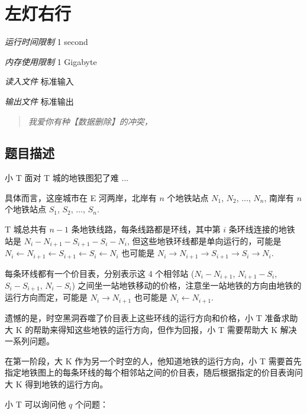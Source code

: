 \section[D. 左灯右行]{ 左灯右行}

\textit{运行时间限制}   1 second

\textit{内存使用限制} 1 Gigabyte

\textit{读入文件} \qquad 标准输入

\textit{输出文件} \qquad 标准输出


\begin{quote}
	\textit{我爱你有种【数据删除】的冲突，}
\end{quote}



\subsection{题目描述}

小 T 面对 T 城的地铁图犯了难 ...

具体而言，这座城市在 E 河两岸，北岸有 $n$ 个地铁站点 $N_1$, $N_2$, $\ldots$, $N_n$, 南岸有 $n$ 个地铁站点 $S_1$, $S_2$, $\ldots$, $S_n$.

T 城总共有 $n - 1$ 条地铁线路，每条线路都是环线，其中第 $i$ 条环线连接的地铁站是 $N_i - N_{i + 1} - S_{i + 1} - S_i - N_i$, 但这些地铁环线都是单向运行的，可能是 $N_i \leftarrow N_{i + 1} \leftarrow S_{i + 1} \leftarrow S_i \leftarrow N_i$ 也可能是 $N_i \rightarrow N_{i + 1} \rightarrow S_{i + 1} \rightarrow S_i \rightarrow N_i$.


每条环线都有一个价目表，分别表示这 4 个相邻站 ($N_i - N_{i + 1}$, $N_{i + 1} - S_i$, $S_i - S_{i + 1}$, $N_i - S_i$) 之间坐一站地铁移动的价格，注意坐一站地铁的方向由地铁的运行方向而定，可能是 $N_i \rightarrow N_{i + 1}$ 也可能是 $N_{i} \leftarrow N_{i + 1}$.

遗憾的是，时空黑洞吞噬了价目表上这些环线的运行方向和价格，小 T 准备求助大 K 的帮助来得知这些地铁的运行方向，但作为回报，小 T 需要帮助大 K 解决一系列问题。

在第一阶段，大 K 作为另一个时空的人，他知道地铁的运行方向，小 T 需要首先指定地铁图上的每条环线的每个相邻站之间的价目表，随后根据指定的价目表询问大 K 得到地铁的运行方向。

小 T 可以询问他 $q$ 个问题：

